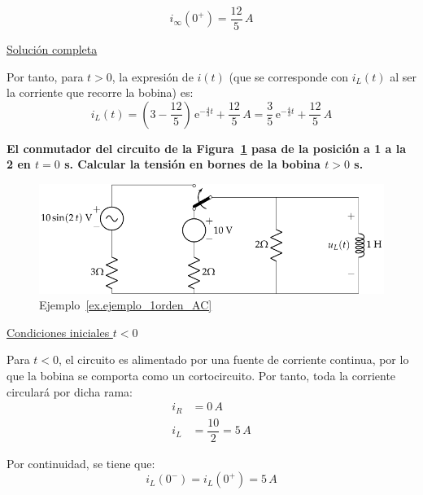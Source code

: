 \begin{example}
  \begin{equation*}
    i_\infty(0^+)=\dfrac{12}{5}\,A
  \end{equation*}
	    
  \underline{Solución completa}
	    
  Por tanto, para $t>0$, la expresión de $i(t)$ (que se corresponde
  con $i_L(t)$ al ser la corriente que recorre la bobina) es:
  \begin{equation*}
    i_L(t)=\left(3-\dfrac{12}{5}\right)\,\mathrm{e}^{-\frac{4}{3}t}+\dfrac{12}{5}\,A=\dfrac{3}{5}\,\mathrm{e}^{-\frac{4}{3}t}+\dfrac{12}{5}\,A
  \end{equation*}
\end{example}
	
\begin{example}\label{ex.ejemplo_1orden_AC}
	
  \textbf{El conmutador del circuito de la
    Figura~\ref{fig.ej_transitorio_1orden_AC} pasa de la posición a 1
    a la 2 en $t = 0$ s. Calcular la tensión en bornes de la bobina
    $t > 0$ s.}
	
  \begin{figure}[H]
    \centering \includegraphics{../figs/ej_transitorio_1orden_AC.pdf}
    \caption{Ejemplo~\ref{ex.ejemplo_1orden_AC}}
    \label{fig.ej_transitorio_1orden_AC}
  \end{figure}
	    
  \underline{Condiciones iniciales $t<0$}
	
  Para $t<0$, el circuito es alimentado por una fuente de corriente
  continua, por lo que la bobina se comporta como un
  cortocircuito. Por tanto, toda la corriente circulará por dicha
  rama:
  \begin{align*}
    i_R&=0 \,A\\
    i_L&=\dfrac{10}{2}=5\,A
  \end{align*}
    
  Por continuidad, se tiene que:
  \begin{equation*}
    i_L(0^-)=i_L(0^+)=5\,A
  \end{equation*}
	

\end{example}
